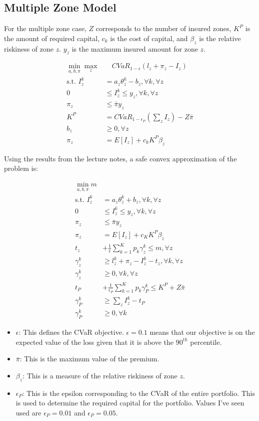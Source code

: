 \documentclass[11pt]{article}
\begin{document}
\subsection*{Multiple Zone Model}
For the multiple zone case, $Z$ corresponds to the number of insured zones, $K^P$ is the amount of required capital, $c_k$ is the cost of capital, and $\beta_z$ is the relative riskiness of zone $z$. $y_z$ is the maximum insured amount for zone $z$. 

\begin{align}
    \min_{a,b,\pi} \max_z &\quad CVaR_{1-\epsilon}(l_z + \pi_z -I_z)\\
    \text{s.t.   } I_z^k &= a_z\theta^k_z -b_z, \forall k, \forall z\\
    0 &\leq I_z^k \leq y_z, \forall k, \forall z \\
    \pi_z &\leq \bar{\pi}y_z \\
    K^P &= CVaR_{1-\epsilon_P}\left (\sum_z I_z \right ) - Z\bar{\pi}\\
    b_z &\geq 0, \forall z\\
    \pi_z &= E[I_z]+c_k K^P \beta_z
\end{align}

Using the results from the lecture notes, a safe convex approximation of the problem is: 

\begin{align}
    \min_{a,b,\pi} m\\
    \text{s.t.   } I_z^k &= a_z\theta^k_z +b_z, \forall k, \forall z\\
    0 &\leq I_z^k \leq y_z, \forall k, \forall z \\
    \pi_z &\leq \bar{\pi}y_z\\
    \pi_z &= E[I_z]+c_K K^P\beta_z\\
    t_z &+ \frac{1}{\epsilon} \sum_{k=1}^K p_k \gamma_z^k \leq m, \forall z \\
    \gamma_z^k &\geq l_z^k + \pi_z -I_z^k -t_z, \forall k, \forall z\\
    \gamma_z^k &\geq 0, \forall k, \forall z\\
    t_P &+ \frac{1}{\epsilon_P} \sum_{k=1}^K p_k \gamma_P^k \leq K^P + Z \bar{\pi}\\
    \gamma_P^k &\geq \sum_z I_z^k -t_P\\
    \gamma_P^k &\geq 0, \forall k
\end{align}

\begin{itemize}
    \item $\epsilon$: This defines the CVaR objective. $\epsilon = 0.1$ means that our objective is on the expected value of the loss given that it is above the $90^{th}$ percentile. 
    \item $\bar{\pi}$: This is the maximum value of the premium. 
    \item $\beta_z$: This is a measure of the relative riskiness of zone $z$. 
    \item $\epsilon_P$: This is the epsilon corresponding to the CVaR of the entire portfolio. This is used to determine the required capital for the portfolio. Values I've seen used are $\epsilon_P=0.01$ and $\epsilon_P=0.05$. 
\end{itemize}
\end{document}
